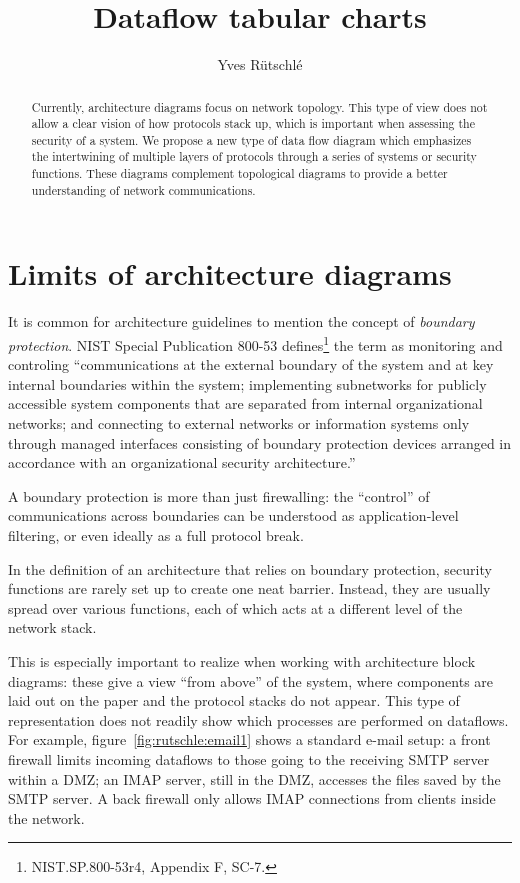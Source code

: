 \documentclass{article}
\title{Dataflow tabular charts}
\author{Yves R\"utschl\'e}
\begin{document}
\maketitle
{}

\begin{abstract}
	Currently, architecture diagrams focus on network topology. This type of view does not allow a clear vision of how protocols stack up, which is important when assessing the security of a system. We propose a new type of data flow diagram which emphasizes the intertwining of multiple layers of protocols through a series of systems or security functions. These diagrams complement topological diagrams to provide a better understanding of network communications.
\end{abstract}


\section{Limits of architecture diagrams}


It is common for architecture guidelines to mention the concept of
\emph{boundary protection}. NIST Special Publication 800-53 defines\footnote{NIST.SP.800-53r4, Appendix F, SC-7.} the term as
monitoring and controling ``communications at the external boundary of the
system and at key internal boundaries within the system; implementing
subnetworks for publicly accessible system components that are separated from
internal organizational networks; and connecting to external networks or
information systems only through managed interfaces consisting of boundary
protection devices arranged in accordance with an organizational security
architecture.''

A boundary protection is more than just firewalling: the ``control'' of
communications across boundaries can be understood as application-level
filtering, or even ideally as a full protocol break.


In the definition of an architecture that relies on boundary protection,
security functions are rarely set up to create one neat barrier. Instead, they
are usually spread over various functions, each of which acts at a different
level of the network stack.

This is especially important to realize when working with architecture block
diagrams: these give a view ``from above'' of the system, where components are
laid out on the paper and the protocol stacks do not appear. This type of
representation does not readily show which processes are performed on dataflows.
For example, figure~\ref{fig:rutschle:email1} shows a standard e-mail setup: a front
firewall limits incoming dataflows to those going to the receiving SMTP server
within a DMZ; an IMAP server, still in the DMZ, accesses the files saved by the
SMTP server. A back firewall only allows IMAP connections from clients inside
the network. 
\end{document}
